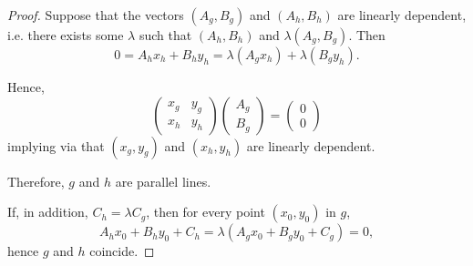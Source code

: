 \begin{proof}
  Suppose that the vectors \( (A_g, B_g) \) and \( (A_h, B_h) \) are linearly dependent, i.e. there exists some \( \lambda \) such that \( (A_h, B_h) \) and \( \lambda (A_g, B_g) \). Then
  \begin{equation*}
    0 = A_h x_h + B_h y_h = \lambda (A_g x_h) + \lambda (B_g y_h).
  \end{equation*}

  Hence,
  \begin{equation*}
    \begin{pmatrix}
      x_g & y_g \\
      x_h & y_h
    \end{pmatrix}
    \begin{pmatrix}
      A_g \\ B_g
    \end{pmatrix}
    =
    \begin{pmatrix}
      0 \\ 0
    \end{pmatrix}
  \end{equation*}
  implying via  that \( (x_g, y_g) \) and \( (x_h, y_h) \) are linearly dependent.

  Therefore, \( g \) and \( h \) are parallel lines.

  If, in addition, \( C_h = \lambda C_g \), then for every point \( (x_0, y_0) \) in \( g \),
  \begin{equation*}
    A_h x_0 + B_h y_0 + C_h = \lambda (A_g x_0 + B_g y_0 + C_g) = 0,
  \end{equation*}
  hence \( g \) and \( h \) coincide.
\end{proof}

